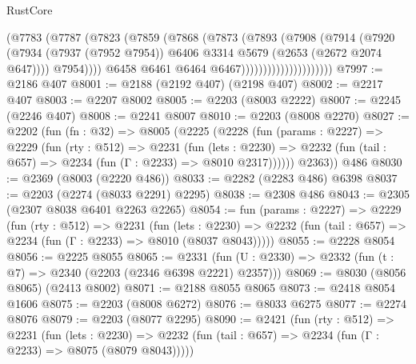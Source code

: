 \begin{lexlean}{RustCore}
\begin{coremodule}
                                    (@7783
                                      (@7787
                                        (@7823
                                          (@7859
                                            (@7868
                                              (@7873
                                                (@7893
                                                  (@7908
                                                    (@7914
                                                      (@7920
                                                        (@7934
                                                          (@7937 (@7952 @7954))
                                                          @6406
                                                          @3314
                                                          @5679
                                                          (@2653 (@2672 @2074 @647))))
                                                      @7954))))
                                              @6458
                                              @6461
                                              @6464
                                              @6467)))))))))))))))))))))
@7997 := @2186 @407
@8001 := @2188 (@2192 @407) (@2198 @407)
@8002 := @2217 @407
@8003 := @2207 @8002
@8005 := @2203 (@8003 @2222)
@8007 := @2245 (@2246 @407)
@8008 := @2241 @8007
@8010 := @2203 (@8008 @2270)
@8027 := @2202
    (fun (fn : @32) =>
    @8005
      (@2225
        (@2228
          (fun (params : @2227) =>
          @2229
            (fun (rty : @512) =>
            @2231
              (fun (lets : @2230) =>
              @2232 (fun (tail : @657) => @2234 (fun (Γ : @2233) => @8010 @2317))))))
        @2363))
    @486
@8030 := @2369 (@8003 (@2220 @486))
@8033 := @2282 (@2283 @486) @6398
@8037 := @2203 (@2274 (@8033 @2291) @2295)
@8038 := @2308 @486
@8043 := @2305 (@2307 @8038 @6401 @2263 @2265)
@8054 := fun (params : @2227) =>
  @2229
    (fun (rty : @512) =>
    @2231
      (fun (lets : @2230) =>
      @2232 (fun (tail : @657) => @2234 (fun (Γ : @2233) => @8010 (@8037 @8043)))))
@8055 := @2228 @8054
@8056 := @2225 @8055
@8065 := @2331 (fun (U : @2330) => @2332 (fun (t : @7) => @2340 (@2203 (@2346 @6398 @2221) @2357)))
@8069 := @8030 (@8056 @8065) (@2413 @8002)
@8071 := @2188 @8055 @8065
@8073 := @2418 @8054 @1606
@8075 := @2203 (@8008 @6272)
@8076 := @8033 @6275
@8077 := @2274 @8076
@8079 := @2203 (@8077 @2295)
@8090 := @2421
    (fun (rty : @512) =>
    @2231
      (fun (lets : @2230) =>
      @2232 (fun (tail : @657) => @2234 (fun (Γ : @2233) => @8075 (@8079 @8043)))))

\end{coremodule}
\end{lexlean}
